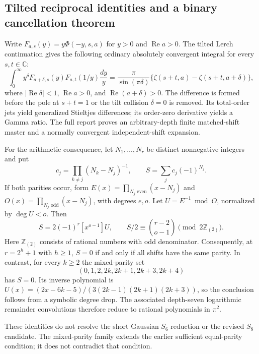 \subsection{Tilted reciprocal identities and a binary cancellation theorem}
\label{tiltbin:sec:summary}
Write $F_{a,s}(y)=y\Phi(-y,s,a)$ for $y>0$ and $\operatorname{Re}a>0$.
The tilted Lerch continuation \cite{tlbc:report} gives the following ordinary
absolutely convergent integral for every $s,t\in\mathbb C$:
\begin{equation}\label{tiltbin:eq:pair}
 \int_0^\infty y^\delta F_{a+\delta,s}(y)F_{a,t}(1/y)\frac{dy}{y}
 =\frac{\pi}{\sin(\pi\delta)}
       \{\zeta(s+t,a)-\zeta(s+t,a+\delta)\},
\end{equation}
where $|\operatorname{Re}\delta|<1$, $\operatorname{Re}a>0$, and
$\operatorname{Re}(a+\delta)>0$. The difference is formed before the pole
at $s+t=1$ or the tilt collision $\delta=0$ is removed. Its total-order
jets yield generalized Stieltjes differences; its order-zero derivative
yields a Gamma ratio. The full report proves an arbitrary-depth finite
matched-shift master and a normally convergent independent-shift expansion.

For the arithmetic consequence, let $N_1,\ldots,N_r$ be distinct
nonnegative integers and put
\[
 c_j=\prod_{k\ne j}(N_k-N_j)^{-1},\qquad
 S=\sum_jc_j(-1)^{N_j}.
\]
If both parities occur, form
$E(x)=\prod_{N_j\text{ even}}(x-N_j)$ and
$O(x)=\prod_{N_j\text{ odd}}(x-N_j)$, with degrees $e,o$.
Let $U=E^{-1}\bmod O$, normalized by $\deg U<o$.
Then
\begin{equation}\label{tiltbin:eq:binary}
 S=2(-1)^r[x^{o-1}]U,
 \qquad S/2\equiv\binom{r-2}{o-1}\pmod{2\mathbb Z_{(2)}}.
\end{equation}
Here $\mathbb Z_{(2)}$ consists of rational numbers with odd denominator.
Consequently, at $r=2^h+1$ with $h\ge1$, $S=0$ if and only if all shifts
have the same parity. In contrast, for every $k\ge2$ the mixed-parity set
\[
 (0,1,2,2k,2k+1,2k+3,2k+4)
\]
has $S=0$. Its inverse polynomial is
$U(x)=(2x-6k-5)/(3(2k-1)(2k+1)(2k+3))$, so the conclusion follows
from a symbolic degree drop. The associated depth-seven logarithmic
remainder convolutions therefore reduce to rational polynomials in
$\pi^2$.

These identities do not resolve the short Gaussian $S_6$ reduction or
the revised $S_8$ candidate. The mixed-parity family extends the earlier
sufficient equal-parity condition; it does not contradict that condition.
